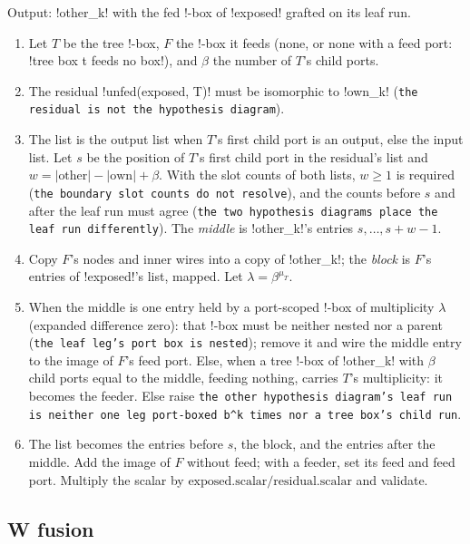 \begin{algorithm}\label{alg:kernel-fed-replacement}
Output: \code!other_k! with the fed !-box of \code!exposed! grafted on its leaf run.
\begin{enumerate}
\item Let $T$ be the tree !-box, $F$ the !-box it feeds (none, or none with a feed port: \code!tree box t feeds no box!), and $\beta$ the number of $T$'s child ports.
\item The residual \py!unfed(exposed, T)! must be isomorphic to \code!own_k! (\texttt{the residual is not the hypothesis diagram}).
\item The list is the output list when $T$'s first child port is an output, else the input list. Let $s$ be the position of $T$'s first child port in the residual's list and $w=|\text{other}|-|\text{own}|+\beta$. With the slot counts of both lists, $w\ge1$ is required (\texttt{the boundary slot counts do not resolve}), and the counts before $s$ and after the leaf run must agree (\texttt{the two hypothesis diagrams place the leaf run differently}). The \emph{middle} is \code!other_k!'s entries $s,\ldots,s+w-1$.
\item Copy $F$'s nodes and inner wires into a copy of \code!other_k!; the \emph{block} is $F$'s entries of \code!exposed!'s list, mapped. Let $\lambda=\beta^{\mu_T}$.
\item When the middle is one entry held by a port-scoped !-box of multiplicity $\lambda$ (expanded difference zero): that !-box must be neither nested nor a parent (\texttt{the leaf leg's port box is nested}); remove it and wire the middle entry to the image of $F$'s feed port. Else, when a tree !-box of \code!other_k! with $\beta$ child ports equal to the middle, feeding nothing, carries $T$'s multiplicity: it becomes the feeder. Else raise \texttt{the other hypothesis diagram's leaf run is neither one leg port-boxed b\^{}k times nor a tree box's child run}.
\item The list becomes the entries before $s$, the block, and the entries after the middle. Add the image of $F$ without feed; with a feeder, set its feed and feed port. Multiply the scalar by $\text{exposed.scalar}/\text{residual.scalar}$ and validate.
\end{enumerate}
\end{algorithm}

\subsection{W fusion}

